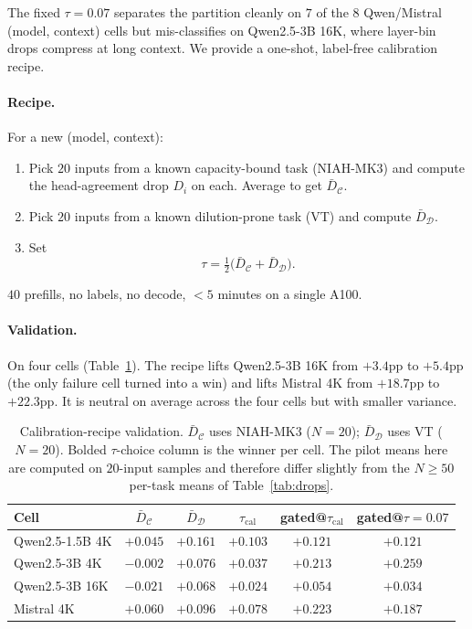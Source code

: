 \documentclass{article}
\begin{document}
The fixed $\tau = 0.07$ separates the partition cleanly on $7$ of the $8$
Qwen/Mistral (model, context) cells but mis-classifies on Qwen2.5-3B 16K,
where layer-bin drops compress at
long context. We provide a one-shot, label-free calibration recipe.

\paragraph{Recipe.} For a new (model, context):
\begin{enumerate}
  \item Pick $20$ inputs from a known capacity-bound task (NIAH-MK3) and
  compute the head-agreement drop $D_i$ on each. Average to get
  $\bar D_{\mathcal C}$.
  \item Pick $20$ inputs from a known dilution-prone task (VT) and compute
  $\bar D_{\mathcal D}$.
  \item Set
  \begin{equation}
  \label{eq:tau}
  \tau = \tfrac{1}{2}\bigl(\bar D_{\mathcal C} + \bar D_{\mathcal D}\bigr).
  \end{equation}
\end{enumerate}
$40$ prefills, no labels, no decode, $<5$ minutes on a single A100.

\paragraph{Validation.} On four cells (Table~\ref{tab:recipe}). The recipe
lifts Qwen2.5-3B 16K from $+3.4$pp to $+5.4$pp (the only failure cell turned
into a win) and lifts Mistral 4K from $+18.7$pp to $+22.3$pp. It is
neutral on average across the four cells but with smaller variance.

\begin{table}[t]
\centering
\caption{Calibration-recipe validation. $\bar D_{\mathcal C}$ uses NIAH-MK3
($N = 20$); $\bar D_{\mathcal D}$ uses VT ($N = 20$).
Bolded $\tau$-choice column is the winner per cell. The pilot means here
are computed on $20$-input samples and therefore differ slightly from the
$N \ge 50$ per-task means of Table~\ref{tab:drops}.}
\label{tab:recipe}
\begin{tabular}{lccccc}
\toprule
Cell & $\bar D_{\mathcal C}$ & $\bar D_{\mathcal D}$ & $\tau_{\mathrm{cal}}$
& gated@$\tau_{\mathrm{cal}}$ & gated@$\tau\!=\!0.07$ \\
\midrule
Qwen2.5-1.5B 4K & $+0.045$ & $+0.161$ & $+0.103$ & $+0.121$ & $+0.121$ \\
Qwen2.5-3B 4K   & $-0.002$ & $+0.076$ & $+0.037$ & $+0.213$ & $\boldsymbol{+0.259}$ \\
Qwen2.5-3B 16K  & $-0.021$ & $+0.068$ & $+0.024$ & $\boldsymbol{+0.054}$ & $+0.034$ \\
Mistral 4K       & $+0.060$ & $+0.096$ & $+0.078$ & $\boldsymbol{+0.223}$ & $+0.187$ \\
\bottomrule
\end{tabular}
\end{table}
\end{document}
